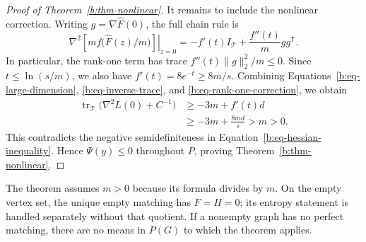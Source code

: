 \begin{proof}[Proof of Theorem~\ref{b:thm-nonlinear}]
It remains to include the nonlinear correction.  Writing
\(g=\nabla\widehat F(0)\), the full chain rule is
\begin{equation}
 \left.\nabla^2\!\left[mf\bigl(\widehat F(z)/m\bigr)\right]
       \right|_{z=0}
 =-f'(t)I_{\mathcal T}+\frac{f''(t)}{m}gg^{\mathsf T}.
 \label{b:eq-rank-one-correction}
\end{equation}
In particular, the rank-one term has trace
\(f''(t)\|g\|_2^2/m\le0\).  Since
\(t\le\ln(s/m)\), we also have \(f'(t)=8e^{-t}\ge8m/s\).
Combining Equations~\eqref{b:eq-large-dimension},
\eqref{b:eq-inverse-trace}, and
\eqref{b:eq-rank-one-correction}, we obtain
\begin{equation}
 \begin{split}
 \operatorname{tr}_{\mathcal T}\bigl(\nabla^2L(0)+C^{-1}\bigr)
 &\ge-3m+f'(t)d\\
 &\ge-3m+\frac{8md}{s}>m>0.
 \end{split}
 \label{b:eq-strict-contradiction}
\end{equation}
This contradicts the negative semidefiniteness in
Equation~\eqref{b:eq-hessian-inequality}.  Hence \(\Psi(y)\le0\)
throughout \(P\), proving Theorem~\ref{b:thm-nonlinear}.
\end{proof}

The theorem assumes \(m>0\) because its formula divides by \(m\).
On the empty vertex set, the unique empty matching has
\(F=H=0\); its entropy statement is handled separately without that
quotient.  If a nonempty graph has no perfect matching, there are no
means in \(P(G)\) to which the theorem applies.
